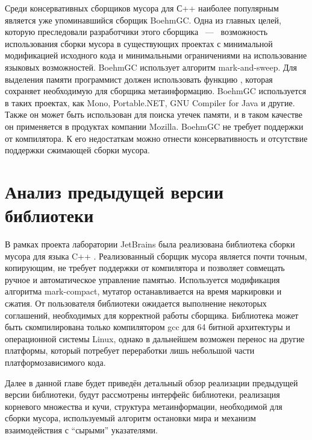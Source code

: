 Среди консервативных сборщиков мусора для С++ наиболее популярным является уже 
упоминавшийся сборщик BoehmGC. 
Одна из главных целей, которую преследовали разработчики этого сборщика ~---~ 
возможность использования сборки мусора в существующих проектах с минимальной 
модификацией исходного кода и минимальными ограничениями на использование языковых 
возможностей. 
BoehmGC использует алгоритм mark-and-sweep. 
Для выделения памяти программист должен использовать функцию , 
которая сохраняет необходимую для сборщика метаинформацию. 
BoehmGC используется в таких проектах, как Mono, Portable.NET, 
GNU Compiler for Java и другие. 
Также он может быть использован для поиска утечек памяти, и в таком качестве он 
применяется в продуктах компании Mozilla. 
BoehmGC не требует поддержки от компилятора. 
К его недостаткам можно отнести консервативность и отсутствие поддержки сжимающей 
сборки мусора.


\section{Анализ предыдущей версии библиотеки}
\label{sec:old_lib}

В рамках проекта лаборатории JetBrains была реализована библиотека сборки мусора для 
языка C++ \cite{book:precisegc_berezun,book:precisegc_samofalov,book:precisegc_secr}. 
Реализованный сборщик мусора является почти точным, копирующим, не требует поддержки 
от компилятора и позволяет совмещать ручное и автоматическое управление памятью. 
Используется модификация алгоритма mark-compact, мутатор останавливается на время 
маркировки и сжатия. 
От пользователя библиотеки ожидается выполнение некоторых соглашений, необходимых для 
корректной работы сборщика. 
Библиотека может быть скомпилирована только компилятором gcc для 64 битной архитектуры 
и операционной системы Linux, однако в дальнейшем возможен перенос на другие платформы, 
который потребует переработки лишь небольшой части платформозависимого кода.

Далее в данной главе будет приведён детальный обзор реализации предыдущей версии 
библиотеки, будут рассмотрены интерфейс библиотеки, реализация корневого множества и 
кучи, структура метаинформации, необходимой для сборки мусора, используемый алгоритм 
остановки мира и механизм взаимодействия с ``сырыми'' указателями.

